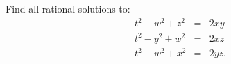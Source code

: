 Find all rational solutions to: \begin{eqnarray*} t^2 - w^2 + z^2 &=& 2xy \\ t^2 - y^2 + w^2 &=& 2xz \\ t^2 - w^2 + x^2 &=& 2yz . \end{eqnarray*}